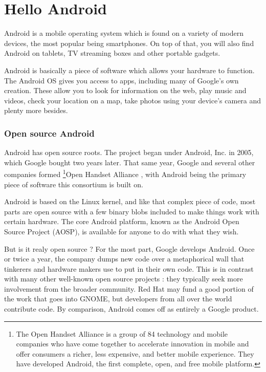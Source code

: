 
\chapter{Hello Android}
Android\cite{Todd2017} is a mobile operating system which is found on a variety of modern devices, the most popular being smartphones. On top of that, you will also find Android on tablets, TV streaming boxes and other portable gadgets.

Android is basically a piece of software which allows your hardware to function. The Android OS gives you access to apps, including many of Google's own creation. These allow you to look for information on the web, play music and videos, check your location on a map, take photos using your device's camera and plenty more besides.

\subsection{Open source Android}
Android has open source roots. The project began under Android, Inc. in 2005, which Google bought two years later. That same year, Google and several other companies formed  \footnote{The Open Handset Alliance is a group of 84 technology and mobile companies who have come together to accelerate innovation in mobile and offer consumers a richer, less expensive, and better mobile experience. They have developed Android, the first complete, open, and free mobile platform.}{Open Handset Alliance} \cite{alliance}, with Android being the primary piece of software this consortium is built on.

Android is based on the Linux kernel, and like that complex piece of code, most parts are open source with a few binary blobs included to make things work with certain hardware. The core Android platform, known as the Android Open Source Project (AOSP), is available for anyone to do with what they wish.

But is it realy open source ? For the most part, Google develops Android. Once or twice a year, the company dumps  new code over a metaphorical wall that tinkerers and hardware makers use to put in their own code. This is in contrast with many other well-known open source projects : they typically seek more involvement from the broader community. Red Hat may fund a good portion of the work that goes into GNOME, but developers from all over the world contribute code. By comparison, Android comes off as entirely a Google product.



